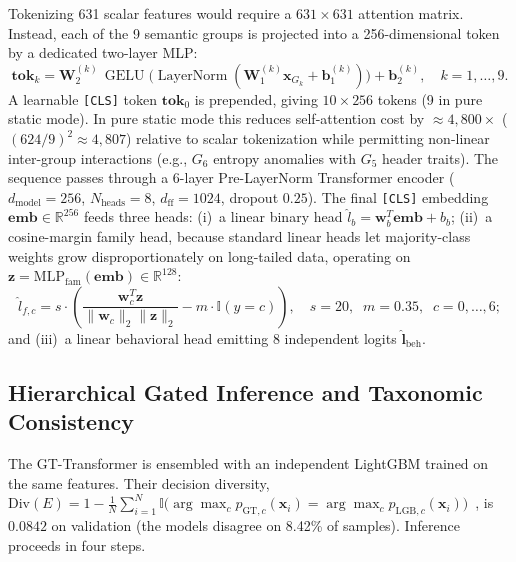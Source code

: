\documentclass[Number]{sn-jnl}
\begin{document}
Tokenizing 631 scalar features would require a $631\times631$ attention matrix. Instead, each of the 9 semantic groups is projected into a 256-dimensional token by a dedicated two-layer MLP:
\begin{equation}
  \mathbf{tok}_k = \mathbf{W}_2^{(k)}\,\operatorname{GELU}\!\big(\operatorname{LayerNorm}(\mathbf{W}_1^{(k)}\mathbf{x}_{G_k} + \mathbf{b}_1^{(k)})\big) + \mathbf{b}_2^{(k)},\quad k=1,\dots,9.
\end{equation}
A learnable \texttt{[CLS]} token $\mathbf{tok}_0$ is prepended, giving $10\times256$ tokens (9 in pure static mode). In pure static mode this reduces self-attention cost by $\approx4{,}800\times$ ($(624/9)^2\approx4{,}807$) relative to scalar tokenization while permitting non-linear inter-group interactions (e.g., $G_6$ entropy anomalies with $G_5$ header traits). The sequence passes through a 6-layer Pre-LayerNorm Transformer encoder ($d_\text{model}=256$, $N_\text{heads}=8$, $d_\text{ff}=1024$, dropout $0.25$). The final \texttt{[CLS]} embedding $\mathbf{emb}\in\mathbb{R}^{256}$ feeds three heads: (i)~a linear binary head $\hat{l}_b=\mathbf{w}_b^T\mathbf{emb}+b_b$; (ii)~a cosine-margin family head, because standard linear heads let majority-class weights grow disproportionately on long-tailed data, operating on $\mathbf{z}=\text{MLP}_\text{fam}(\mathbf{emb})\in\mathbb{R}^{128}$:
\begin{equation}
  \hat{l}_{f,c} = s \cdot \left( \frac{\mathbf{w}_c^T \mathbf{z}}{\|\mathbf{w}_c\|_2 \|\mathbf{z}\|_2} - m \cdot \mathbb{I}(y = c) \right),\quad s=20,\;\; m=0.35,\;\; c=0,\dots,6;
  \label{eq:cosine_head}
\end{equation}
and (iii)~a linear behavioral head emitting 8 independent logits $\hat{\mathbf{l}}_\text{beh}$.

\subsection{Hierarchical Gated Inference and Taxonomic Consistency}\label{subsec:infer}

The GT-Transformer is ensembled with an independent LightGBM trained on the same features. Their decision diversity, $\text{Div}(E)=1-\frac{1}{N}\sum_{i=1}^N\mathbb{I}\big(\arg\max_c p_{\text{GT},c}(\mathbf{x}_i)=\arg\max_c p_{\text{LGB},c}(\mathbf{x}_i)\big)$~\cite{alojaimi2025advanced}, is $0.0842$ on validation (the models disagree on 8.42\% of samples). Inference proceeds in four steps.
\end{document}

